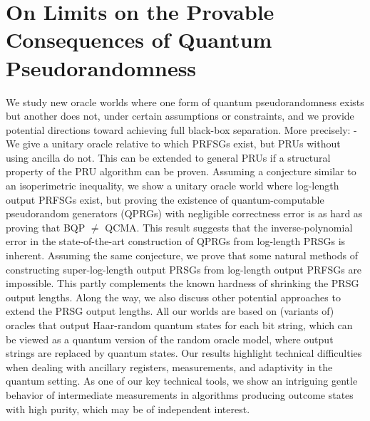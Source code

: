 \documentclass[11pt,oneside]{book}
\theoremstyle{definition}
\theoremstyle{remark}
\theoremstyle{plain}
\begin{document}
\section{\cite{cryptoeprint:2025/1863} On Limits on the Provable Consequences of Quantum Pseudorandomness}
We study new oracle worlds where one form of quantum pseudorandomness exists but another does not, under certain assumptions or constraints, and we provide potential directions toward achieving full black-box separation. More precisely: - We give a unitary oracle relative to which PRFSGs exist, but PRUs without using ancilla do not. This can be extended to general PRUs if a structural property of the PRU algorithm can be proven. Assuming a conjecture similar to an isoperimetric inequality, we show a unitary oracle world where log-length output PRFSGs exist, but proving the existence of quantum-computable pseudorandom generators (QPRGs) with negligible correctness error is as hard as proving that BQP $\neq$ QCMA. This result suggests that the inverse-polynomial error in the state-of-the-art construction of QPRGs from log-length PRSGs is inherent.  Assuming the same conjecture, we prove that some natural methods of constructing super-log-length output PRSGs from log-length output PRFSGs are impossible. This partly complements the known hardness of shrinking the PRSG output lengths. Along the way, we also discuss other potential approaches to extend the PRSG output lengths. All our worlds are based on (variants of) oracles that output Haar-random quantum states for each bit string, which can be viewed as a quantum version of the random oracle model, where output strings are replaced by quantum states. Our results highlight technical difficulties when dealing with ancillary registers, measurements, and adaptivity in the quantum setting. As one of our key technical tools, we show an intriguing gentle behavior of intermediate measurements in algorithms producing outcome states with high purity, which may be of independent interest.
\end{document}
